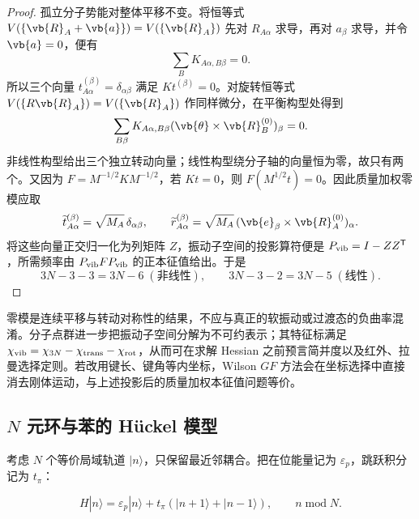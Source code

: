 \begin{proof}
孤立分子势能对整体平移不变。将恒等式
\(V(\{\vb{R}_A+\vb{a}\})=V(\{\vb{R}_A\})\)
先对 \(R_{A\alpha}\) 求导，再对 \(a_\beta\) 求导，并令
\(\vb{a}=0\)，便有
\begin{equation}
 \sum_B K_{A\alpha,B\beta}=0 .
\label{eq:hessian-translation-zero}
\end{equation}
所以三个向量
\(t^{(\beta)}_{A\alpha}=\delta_{\alpha\beta}\)
满足 \(Kt^{(\beta)}=0\)。对旋转恒等式
\(V(\{R\vb{R}_A\})=V(\{\vb{R}_A\})\)
作同样微分，在平衡构型处得到
\begin{equation*}
 \sum_{B\beta}K_{A\alpha,B\beta}
 (\vb{\theta}\times\vb{R}_B^{(0)})_\beta=0 .
\end{equation*}
非线性构型给出三个独立转动向量；线性构型绕分子轴的向量恒为零，故只有两个。又因为
\(F=M^{-1/2}KM^{-1/2}\)，若 \(Kt=0\)，则
\(F(M^{1/2}t)=0\)。因此质量加权零模应取
\begin{equation*}
 \widetilde t_{A\alpha}^{(\beta)}
 =\sqrt{M_A}\,\delta_{\alpha\beta},\qquad
 \widetilde r_{A\alpha}^{(\beta)}
 =\sqrt{M_A}\,(\vb{e}_\beta\times\vb{R}_A^{(0)})_\alpha .
\end{equation*}
将这些向量正交归一化为列矩阵 \(Z\)，振动子空间的投影算符便是
\(P_{\rm vib}=I-ZZ^{\mathsf T}\)，所需频率由
\(P_{\rm vib}FP_{\rm vib}\) 的正本征值给出。于是
\begin{equation*}
3N-3-3=3N-6\;(\text{非线性}),\qquad
3N-3-2=3N-5\;(\text{线性}).
\end{equation*}
\end{proof}

零模是连续平移与转动对称性的结果，不应与真正的软振动或过渡态的负曲率混淆。分子点群进一步把振动子空间分解为不可约表示；其特征标满足
\(\chi_{\rm vib}=\chi_{3N}-\chi_{\rm trans}-\chi_{\rm rot}\)，从而可在求解 Hessian 之前预言简并度以及红外、拉曼选择定则。若改用键长、键角等内坐标，Wilson \(GF\) 方法会在坐标选择中直接消去刚体运动，与上述投影后的质量加权本征值问题等价。


\subsection{\texorpdfstring{\(N\)}{N} 元环与苯的 H\"uckel 模型}

考虑 \(N\) 个等价局域轨道 \(|n\rangle\)，只保留最近邻耦合。把在位能量记为 \(\varepsilon_p\)，跳跃积分记为 \(t_\pi\)：

\begin{equation}
H|n\rangle
=\varepsilon_p|n\rangle
+t_\pi(|n+1\rangle+|n-1\rangle),
\qquad n\;\mathrm{mod}\;N.
\label{eq:ring-huckel-hamiltonian}
\end{equation}

